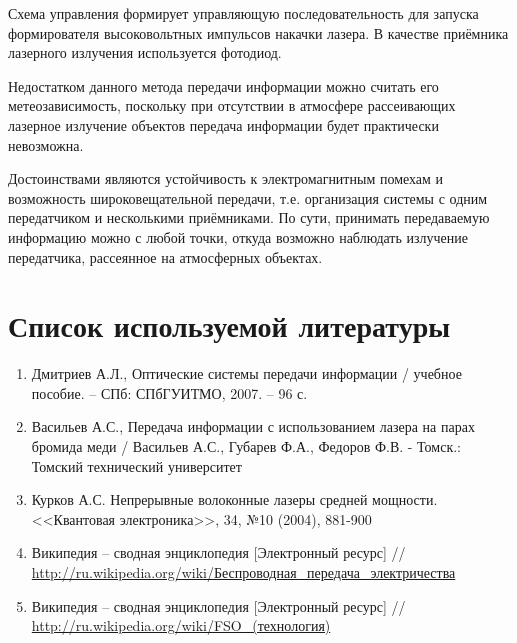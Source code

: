 \documentclass[14pt,pscyr,titlepage]{hedreport}
\begin{document}
		Схема управления формирует управляющую последовательность для запуска 
		формирователя высоковольтных импульсов накачки лазера. В качестве 
		приёмника лазерного излучения используется фотодиод.

		Недостатком данного метода передачи информации можно считать его 
		метеозависимость, поскольку при отсутствии в атмосфере рассеивающих 
		лазерное излучение объектов передача информации будет практически 
		невозможна.

		Достоинствами являются устойчивость к электромагнитным помехам и 
		возможность широковещательной передачи, т.е. организация системы с 
		одним передатчиком и несколькими приёмниками. По сути, принимать 
		передаваемую информацию можно с любой точки, откуда возможно 
		наблюдать излучение передатчика, рассеянное на атмосферных объектах. 
	
	\pagebreak
	\section{Список используемой литературы}
		\begin{enumerate}\itemsep-2pt
			\item Дмитриев А.Л., Оптические системы передачи информации / 
				учебное пособие. -- СПб: СПбГУИТМО, 2007. -- 96 с.
			\item Васильев А.С., Передача информации с использованием лазера 
				на парах бромида меди / Васильев А.С., Губарев Ф.А., 
				Федоров Ф.В. - Томск.: Томский технический университет 
			\item Курков А.С. Непрерывные волоконные лазеры средней мощности.
				<<Квантовая электроника>>, 34, №10 (2004), 881-900
			\item Википедия -- сводная энциклопедия [Электронный ресурс] // 
				\href{http://ru.wikipedia.org/wiki/Беспроводная_передача_электричества}
				{http://ru.wikipedia.org/wiki/Беспроводная_передача_электричества}
			\item Википедия -- сводная энциклопедия [Электронный ресурс] // 
				\href{http://ru.wikipedia.org/wiki/FSO_(технология)}
				{http://ru.wikipedia.org/wiki/FSO_(технология)}
		\end{enumerate}
\end{document}
